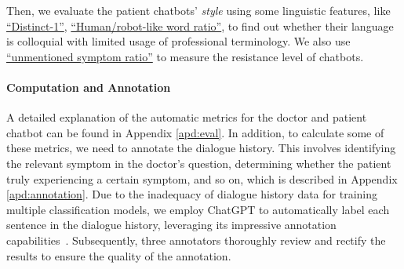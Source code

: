 Then, we evaluate the patient chatbots' \textit{style} using some linguistic features, like \uline{``Distinct-1''}, \uline{``Human/robot-like word ratio''}, to find out whether their language is colloquial with limited usage of professional terminology. We also use \uline{``unmentioned symptom ratio''} to measure the resistance level of chatbots. 

\paragraph{Computation and Annotation}
A detailed explanation of the automatic metrics for the doctor and patient chatbot can be found in Appendix \ref{apd:eval}. 
In addition, to calculate some of these metrics, we need to annotate the dialogue history. This involves identifying the relevant symptom in the doctor's question, determining whether the patient truly experiencing a certain symptom, and so on, which is described in Appendix \ref{apd:annotation}.
Due to the inadequacy of dialogue history data for training multiple classification models, we employ ChatGPT to automatically label each sentence in the dialogue history, leveraging its impressive annotation capabilities~\cite{Gilardi2023ChatGPTOC}. Subsequently, three annotators thoroughly review and rectify the results to ensure the quality of the annotation.




